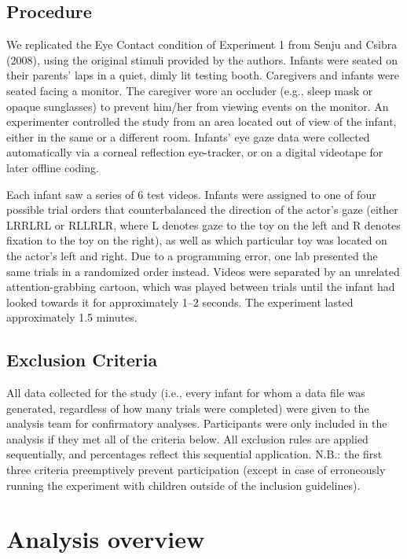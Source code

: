 \documentclass[english,,man,floatsintext]{apa6}
\begin{document}
\hypertarget{procedure}{%
\subsection{Procedure}\label{procedure}}

We replicated the Eye Contact condition of Experiment 1 from Senju and Csibra (2008), using the original stimuli provided by the authors. Infants were seated on their parents' laps in a quiet, dimly lit testing booth. Caregivers and infants were seated facing a monitor. The caregiver wore an occluder (e.g., sleep mask or opaque sunglasses) to prevent him/her from viewing events on the monitor. An experimenter controlled the study from an area located out of view of the infant, either in the same or a different room. Infants' eye gaze data were collected automatically via a corneal reflection eye-tracker, or on a digital videotape for later offline coding.

Each infant saw a series of 6 test videos. Infants were assigned to one of four possible trial orders that counterbalanced the direction of the actor's gaze (either LRRLRL or RLLRLR, where L denotes gaze to the toy on the left and R denotes fixation to the toy on the right), as well as which particular toy was located on the actor's left and right. Due to a programming error, one lab presented the same trials in a randomized order instead. Videos were separated by an unrelated attention-grabbing cartoon, which was played between trials until the infant had looked towards it for approximately 1--2 seconds. The experiment lasted approximately 1.5 minutes.

\hypertarget{exclusion-criteria}{%
\subsection{Exclusion Criteria}\label{exclusion-criteria}}

All data collected for the study (i.e., every infant for whom a data file was generated, regardless of how many trials were completed) were given to the analysis team for confirmatory analyses. Participants were only included in the analysis if they met all of the criteria below. All exclusion rules are applied sequentially, and percentages reflect this sequential application. N.B.: the first three criteria preemptively prevent participation (except in case of erroneously running the experiment with children outside of the inclusion guidelines).

\hypertarget{analysis-overview}{%
\section{Analysis overview}\label{analysis-overview}}
\end{document}
